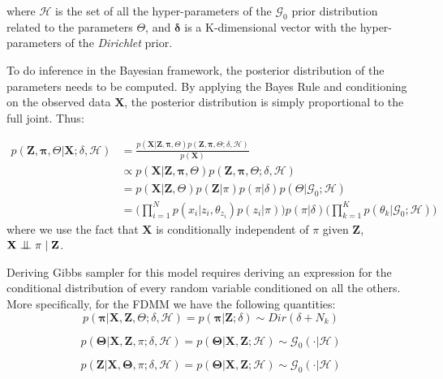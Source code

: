 where $\mathcal{H}$ is the set of all the hyper-parameters of the $\mathcal{G}_{0}$ prior distribution related to the parameters $\Theta$, and $\mathbf{\delta}$ is a K-dimensional vector with the hyper-parameters of the \emph{Dirichlet} prior. 

To do inference in the Bayesian framework, the posterior distribution of the parameters needs to be computed. By applying the Bayes Rule and conditioning on the observed data $\mathbf{X}$, the posterior distribution is simply proportional to the full joint. Thus:
 
\begin{equation}%
  \begin{aligned}
	p(\mathbf{Z},\mathbf{\pi},\Theta|\mathbf{X} ;\delta,\mathcal{H}) & = \frac{p(\mathbf{X}|\mathbf{Z},\mathbf{\pi},\Theta) p(\mathbf{Z},\mathbf{\pi},\Theta ;\delta,\mathcal{H})}{p(\mathbf{X})} \\
	   & \propto p(\mathbf{X}|\mathbf{Z},\mathbf{\pi},\Theta) p(\mathbf{Z},\mathbf{\pi},\Theta ;\delta,\mathcal{H}) \\
	   & = p(\mathbf{X}|\mathbf{Z},\Theta) p(\mathbf{Z}|\pi) p(\pi|\delta) p(\Theta |\mathcal{G}_{0}; \mathcal{H}) \\
	   & = \bigg(\prod\limits_{i=1}^{N} p(x_{i}|z_{i},\theta_{z_{i}}) p(z_{i}|\pi)\bigg) p(\pi|\delta) \bigg(\prod\limits_{k=1}^{K} p(\theta_{k} |\mathcal{G}_{0}; \mathcal{H})\bigg)
  \end{aligned}
\end{equation}
where we use the fact that $\mathbf{X}$ is conditionally independent of $\pi$ given $\mathbf{Z}$, \ie $\mathbf{X} \bigCI \pi \;| \; \mathbf{Z} $. 


Deriving Gibbs sampler for this model requires deriving an expression for the conditional distribution of every random variable conditioned on all the others. More specifically, for the FDMM we have the following quantities:
\begin{equation}%
	p(\mathbf{\pi}|\mathbf{X},\mathbf{Z},\Theta;\delta,\mathcal{H}) = p(\mathbf{\pi} | \mathbf{Z};\delta) \sim Dir(\delta + N_{k})
\end{equation}

\begin{equation}%
	p(\mathbf{\Theta}|\mathbf{X},\mathbf{Z},\pi;\delta,\mathcal{H}) = p(\mathbf{\Theta}|\mathbf{X},\mathbf{Z};\mathcal{H}) \sim \mathcal{G}_{0}(\cdot|\mathcal{H})
\end{equation}

\begin{equation}%
	p(\mathbf{Z}|\mathbf{X},\mathbf{\Theta},\pi;\delta,\mathcal{H}) = p(\mathbf{\Theta}|\mathbf{X},\mathbf{Z};\mathcal{H}) \sim \mathcal{G}_{0}(\cdot|\mathcal{H})
\end{equation}